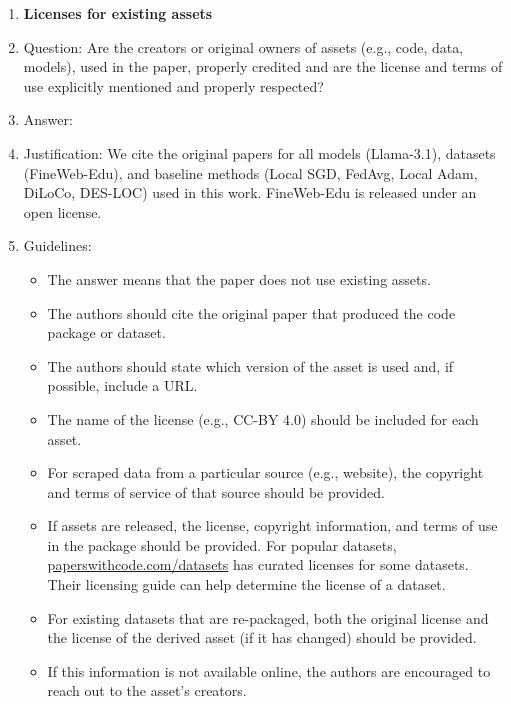 \documentclass{article}
\begin{document}
\begin{enumerate}
\item {\bf Licenses for existing assets}
    \item[] Question: Are the creators or original owners of assets (e.g., code, data, models), used in the paper, properly credited and are the license and terms of use explicitly mentioned and properly respected?
    \item[] Answer: \answerYes{}
    \item[] Justification: We cite the original papers for all models (Llama-3.1), datasets (FineWeb-Edu), and baseline methods (Local SGD, FedAvg, Local Adam, DiLoCo, DES-LOC) used in this work. FineWeb-Edu is released under an open license.
    \item[] Guidelines:
    \begin{itemize}
        \item The answer \answerNA{} means that the paper does not use existing assets.
        \item The authors should cite the original paper that produced the code package or dataset.
        \item The authors should state which version of the asset is used and, if possible, include a URL.
        \item The name of the license (e.g., CC-BY 4.0) should be included for each asset.
        \item For scraped data from a particular source (e.g., website), the copyright and terms of service of that source should be provided.
        \item If assets are released, the license, copyright information, and terms of use in the package should be provided. For popular datasets, \url{paperswithcode.com/datasets} has curated licenses for some datasets. Their licensing guide can help determine the license of a dataset.
        \item For existing datasets that are re-packaged, both the original license and the license of the derived asset (if it has changed) should be provided.
        \item If this information is not available online, the authors are encouraged to reach out to the asset's creators.
    \end{itemize}


\end{enumerate}
\end{document}
